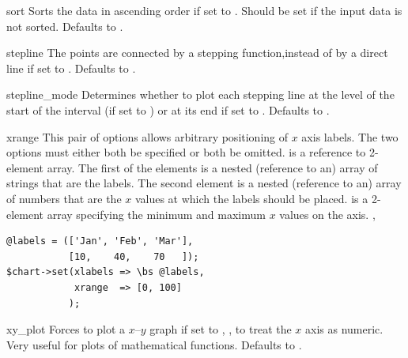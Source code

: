 \begin{AttrDecl}{sort}
Sorts the data in ascending order if set to . Should be
set if the input data is not sorted. Defaults to .
\end{AttrDecl}

\begin{AttrDecl}{stepline}
The points are connected by a stepping function,instead of by a direct
line if set to . Defaults to .
\end{AttrDecl}

\begin{AttrDecl}{stepline\_mode}
Determines whether to plot each stepping line at the level of the
start of the interval (if set to ) or at its end if set
to . Defaults to .
\end{AttrDecl}

\begin{AttrDecl}{xrange}
This pair of options allows arbitrary positioning of $x$ axis labels.
The two options must either both be specified or both be omitted.
 is a reference to 2-element array. The first of the
elements is a nested (reference to an) array of strings that are the
labels. The second element is a nested (reference to an) array of
numbers that are the $x$ values at which the labels should be placed.
 is a 2-element array specifying the minimum and maximum
$x$ values on the axis. \Eg,
\begin{verbatim}
@labels = (['Jan', 'Feb', 'Mar'],
           [10,    40,    70   ]);
$chart->set(xlabels => \bs @labels,
            xrange  => [0, 100]
           );
\end{verbatim}
\end{AttrDecl}

\begin{AttrDecl}{xy\_plot}
Forces \thisclass to plot a $x$--$y$ graph if set to ,
\ie, to treat the $x$ axis as numeric. Very useful for plots of
mathematical functions. Defaults to .
\end{AttrDecl}

